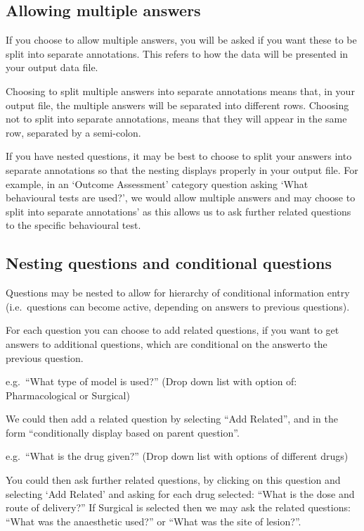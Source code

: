 \documentclass[
]{book}
\begin{document}
\hypertarget{allowing-multiple-answers}{%
\subsection{Allowing multiple answers}\label{allowing-multiple-answers}}

If you choose to allow multiple answers, you will be asked if you want these to be split into separate annotations. This refers to how the data will be presented in your output data file.

Choosing to split multiple answers into separate annotations means that, in your output file, the multiple answers will be separated into different rows. Choosing not to split into separate annotations, means that they will appear in the same row, separated by a semi-colon.

If you have nested questions, it may be best to choose to split your answers into separate annotations so that the nesting displays properly in your output file. For example, in an `Outcome Assessment' category question asking `What behavioural tests are used?', we would allow multiple answers and may choose to split into separate annotations' as this allows us to ask further related questions to the specific behavioural test.

\hypertarget{nesting-questions-and-conditional-questions}{%
\subsection{Nesting questions and conditional questions}\label{nesting-questions-and-conditional-questions}}

Questions may be nested to allow for hierarchy of conditional information entry (i.e.~questions can become active, depending on answers to previous questions).

For each question you can choose to add related questions, if you want to get answers to additional questions, which are conditional on the answerto the previous question.

e.g.~``What type of model is used?''
(Drop down list with option of: Pharmacological or Surgical)

We could then add a related question by selecting ``Add Related'', and in the form ``conditionally display based on parent question''.

e.g.~``What is the drug given?''
(Drop down list with options of different drugs)

You could then ask further related questions, by clicking on this question and selecting `Add Related' and asking for each drug selected: ``What is the dose and route of delivery?'' If Surgical is selected then we may ask the related questions: ``What was the anaesthetic used?'' or ``What was the site of lesion?''.
\end{document}
